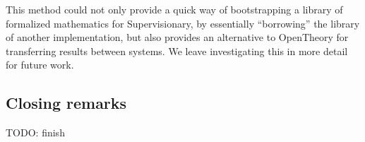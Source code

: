 \documentclass[a4paper, UKenglish, cleveref, autoref, thm-restate, colorlinks]{lipics-v2021}
\newcommand{\todo}[1]{}
\renewcommand{\todo}[1]{{\color{red} TODO: {#1}}}
\begin{document}
This method could not only provide a quick way of bootstrapping a library of formalized mathematics for Supervisionary, by essentially ``borrowing'' the library of another implementation, but also provides an alternative to OpenTheory for transferring results between systems.
We leave investigating this in more detail for future work.

\subsection{Closing remarks}

\todo{finish}


\end{document}

